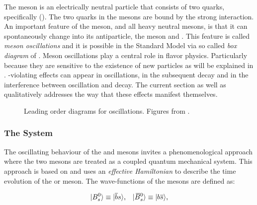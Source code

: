 The \Bs meson is an electrically neutral particle that consists of two quarks, specifically (\bquarkbar\squark).
The two quarks in the mesons are bound by the strong interaction. An important feature of
the \Bs meson, and all heavy neutral mesons, is that it can spontaneously change into its antiparticle,
the \Bsb meson and \viceversa. This feature is called {\it meson oscillations} and it is possible
in the Standard Model via so called {\it box diagram} of .
Meson oscillations play a central role in flavor physics. Particularly because they are sensitive to the
existence of new particles as will be explained in . \CP-violating effects can
appear in \BBbarSyst oscillations, in the subsequent decay and in the interference between oscillation
and decay. The current section as well as  qualitatively addresses the way that
these effects manifest themselves.

\begin{figure}[!h]
  \centering
  \begin{subfigure}{0.5\textwidth}
    \raggedright
    \centering
    \scalebox{0.9}{\sffamily }
    \caption{}
    \label{bs_box_1}
  \end{subfigure}%
  \hfill%
  \begin{subfigure}{0.5\textwidth}
    \raggedleft
    \centering
    \scalebox{0.9}{\sffamily }
    \caption{}
    \label{bs_box_2}
  \end{subfigure}
  \caption{Leading order diagrams for \BBbarSyst oscillations. Figures from \cite{jeroenThesis}.}
  \label{bs_box}
\end{figure}

\subsubsection{The \BBbarSyst System}
\label{the_bbar_system}

The oscillating behaviour of the \Bs and \Bsb mesons invites a phenomenological approach
where the two mesons are treated as a coupled quantum mechanical system. This approach
is based on \cite{Weisskopf:1930au,Weisskopf:1930ps} and uses an {\it effective Hamiltonian}\cite{eff-hamiltonian-bs-syst,DeBruyn-thesis}
to describe the time evolution of the \Bs or \Bsb meson. The wave-functions of the mesons
are defined as:

\begin{equation}
  \centering
  \ket{\Bs}  \equiv  \ket{\bquarkbar\squark}, \;\;\; \ket{\Bsb} \equiv  \ket{\bquark\squarkbar},
  \label{bs_wavefunctions}
\end{equation}

